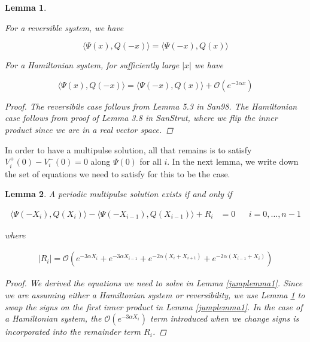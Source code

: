 \documentclass[12pt]{article}
\newtheorem{lemma}{Lemma}
\begin{document}

\begin{lemma}\label{otherIP}

For a reversible system, we have

\begin{equation}
\langle \Psi(x), Q(-x) \rangle = \langle \Psi(-x), Q(x) \rangle
\end{equation}

For a Hamiltonian system, for sufficiently large $|x|$ we have

\begin{equation}
\langle \Psi(x), Q(-x) \rangle = \langle \Psi(-x), Q(x) \rangle
+ \mathcal{O}(e^{-3 \alpha x})
\end{equation}

\begin{proof}
The reversibile case follows from Lemma 5.3 in San98. The Hamiltonian case follows from proof of Lemma 3.8 in SanStrut, where we flip the inner product since we are in a real vector space. 
\end{proof}
\end{lemma}

In order to have a multipulse solution, all that remains is to satisfy $V_i^+(0) - V_i^-(0) = 0$ along $\Psi(0)$ for all $i$. In the next lemma, we write down the set of equations we need to satisfy for this to be the case.

\begin{lemma}\label{IPsystem}
A periodic multipulse solution exists if and only if 

\begin{align}\label{jumpIPdiff}
\langle \Psi(-X_i), Q(X_i) \rangle - \langle \Psi(-X_{i-1}), Q(X_{i-1}) \rangle + R_i &= 0 && i = 0, \dots, n-1
\end{align}

where 

\begin{align*}
|R_i| = \mathcal{O} ( e^{-3 \alpha X_i} +  e^{-3 \alpha X_{i-1}}
+ e^{-2 \alpha (X_i + X_{i+1})} + e^{-2 \alpha (X_{i-1} + X_i)})
\end{align*}

\begin{proof}
We derived the equations we need to solve in Lemma \ref{jumplemma1}. Since we are assuming either a Hamiltonian system or reversibility, we use Lemma \ref{otherIP} to swap the signs on the first inner product in Lemma \ref{jumplemma1}. In the case of a Hamiltonian system, the $\mathcal{O}(e^{-3 \alpha X_i})$ term introduced when we change signs is incorporated into the remainder term $R_i$.
\end{proof}
\end{lemma}
\end{document}
